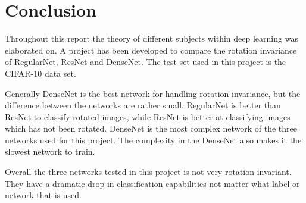 \chapter{Conclusion}
\label{chp:conc}

Throughout this report the theory of different subjects within deep learning was elaborated on. A project has been developed to compare the rotation invariance of RegularNet, ResNet and DenseNet. The test set used in this project is the CIFAR-10 data set.

Generally DenseNet is the best network for handling rotation invariance, but the difference between the networks are rather small. RegularNet is better than ResNet to classify rotated images, while ResNet is better at classifying images which has not been rotated. DenseNet is the most complex network of the three networks used for this project. The complexity in the DenseNet also makes it the slowest network to train.
\newline

Overall the three networks tested in this project is not very rotation invariant. They have a dramatic drop in classification capabilities not matter what label or network that is used.